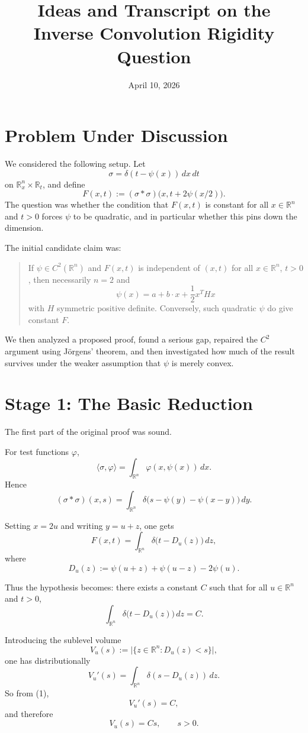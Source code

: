 \documentclass[11pt]{article}
\title{Ideas and Transcript on the Inverse Convolution Rigidity Question}
\author{}
\date{April 10, 2026}
\begin{document}
\maketitle

\section*{Problem Under Discussion}

We considered the following setup. Let
\[
\sigma=\delta(t-\psi(x))\,dx\,dt
\]
on $\mathbb{R}^n_x\times \mathbb{R}_t$, and define
\[
F(x,t):=(\sigma * \sigma)\bigl(x,t+2\psi(x/2)\bigr).
\]
The question was whether the condition that $F(x,t)$ is constant for all $x\in\mathbb{R}^n$ and $t>0$ forces $\psi$ to be quadratic, and in particular whether this pins down the dimension.

The initial candidate claim was:
\begin{quote}
If $\psi\in C^2(\mathbb{R}^n)$ and $F(x,t)$ is independent of $(x,t)$ for all $x\in\mathbb{R}^n$, $t>0$, then necessarily $n=2$ and
\[
\psi(x)=a+b\cdot x+\frac12 x^T Hx
\]
with $H$ symmetric positive definite. Conversely, such quadratic $\psi$ do give constant $F$.
\end{quote}

We then analyzed a proposed proof, found a serious gap, repaired the $C^2$ argument using J\"orgens' theorem, and then investigated how much of the result survives under the weaker assumption that $\psi$ is merely convex.

\section*{Stage 1: The Basic Reduction}

The first part of the original proof was sound.

For test functions $\varphi$,
\[
\langle \sigma,\varphi\rangle=\int_{\mathbb{R}^n}\varphi(x,\psi(x))\,dx.
\]
Hence
\[
(\sigma * \sigma)(x,s)
=\int_{\mathbb{R}^n}\delta\bigl(s-\psi(y)-\psi(x-y)\bigr)\,dy.
\]

Setting $x=2u$ and writing $y=u+z$, one gets
\[
F(x,t)
=\int_{\mathbb{R}^n}\delta\bigl(t-D_u(z)\bigr)\,dz,
\]
where
\[
D_u(z):=\psi(u+z)+\psi(u-z)-2\psi(u).
\]

Thus the hypothesis becomes: there exists a constant $C$ such that for all $u\in\mathbb{R}^n$ and $t>0$,
\[
\int_{\mathbb{R}^n}\delta\bigl(t-D_u(z)\bigr)\,dz=C.
\tag{1}
\]

Introducing the sublevel volume
\[
V_u(s):=\bigl|\{z\in\mathbb{R}^n:D_u(z)<s\}\bigr|,
\]
one has distributionally
\[
V_u'(s)=\int_{\mathbb{R}^n}\delta(s-D_u(z))\,dz.
\]
So from (1),
\[
V_u'(s)=C,
\]
and therefore
\[
V_u(s)=Cs,\qquad s>0.
\tag{2}
\]
\end{document}
